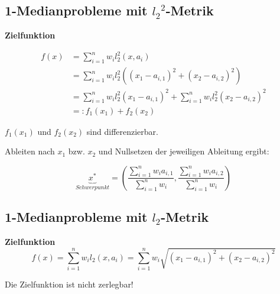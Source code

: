 
    \subsection{1-Medianprobleme mit ${l_2}^{2}$-Metrik} %
    \label{sub:1_medianprobleme_mit_l2^2_Metrik}

    \par \textbf{Zielfunktion}

    \begin{equation}
      \begin{aligned}
        f(x) &= \sum_{i=1}^{n}w_{i}l_{2}^{2}(x, a_i) \\
             &= \sum_{i=1}^{n}w_{i}l_{2}^{2}((x_1 - a_{i, 1})^2 + (x_2 - a_{i,2})^2) \\
             &= \sum_{i=1}^{n}w_{i}l_{2}^{2}(x_1 - a_{i, 1})^2 + \sum_{i=1}^{n}w_{i}l_{2}^{2}(x_2 - a_{i, 2})^2 \\
             &=: f_1(x_1) + f_2(x_2)
      \end{aligned}
    \end{equation}

    \par $f_1(x_1)$ und $f_2(x_2)$ sind differenzierbar.

    \par Ableiten nach $x_1$ bzw. $x_2$ und Nullsetzen der jeweiligen Ableitung ergibt:

    \begin{equation*}
      \underbrace{x^*}_{Schwerpunkt} = \left(\frac{\sum_{i=1}^{n}w_ia_{i,1}}{\sum_{i=1}^{n}w_i}, \frac{\sum_{i=1}^{n}w_ia_{i,2}}{\sum_{i=1}^{n}w_i} \right)
    \end{equation*}
    

    \subsection{1-Medianprobleme mit $l_2$-Metrik} %
    \label{sub:1_medianprobleme_mit_l2_Metrik}

      \par \textbf{Zielfunktion}
      \begin{equation}
        f(x) = \sum_{i=1}^{n}w_il_2(x, a_i) = \sum_{i=1}^{n}w_i\sqrt{(x_1 - a_{i,1})^2 + (x_2 - a_{i,2})^2}
      \end{equation}

      \par Die Zielfunktion ist nicht zerlegbar!

